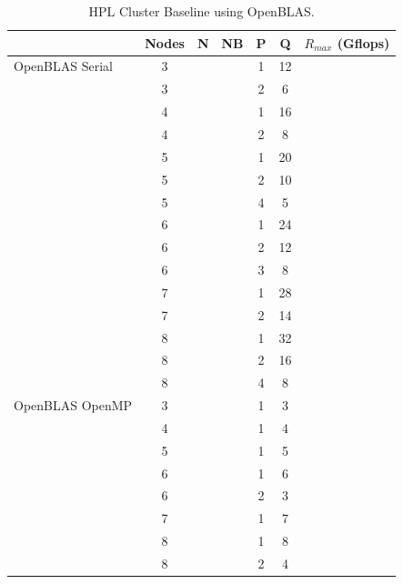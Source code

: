\documentclass{report}
\begin{document}
\begin{table}
\begin{center}
\begin{tabular}{ |l|c|c|c|c|c|c| } 
\hline
                & Nodes & N & NB & P & Q & $R_{max}$ (Gflops) \\ 
\hline
OpenBLAS Serial & 3 & & & 1 & 12 & \\ 
                & 3 & & & 2 &  6 & \\
                \cline{2-7} 
                & 4 & & & 1 & 16 & \\ 
                & 4 & & & 2 &  8 & \\ 
                \cline{2-7} 
                & 5 & & & 1 & 20 & \\ 
                & 5 & & & 2 & 10 & \\ 
                & 5 & & & 4 &  5 & \\ 
                \cline{2-7} 
                & 6 & & & 1 & 24 & \\ 
                & 6 & & & 2 & 12 & \\ 
                & 6 & & & 3 &  8 & \\ 
                \cline{2-7} 
                & 7 & & & 1 & 28 & \\ 
                & 7 & & & 2 & 14 & \\ 
                \cline{2-7} 
                & 8 & & & 1 & 32 & \\ 
                & 8 & & & 2 & 16 & \\ 
                & 8 & & & 4 &  8 & \\ 
\hline
OpenBLAS OpenMP & 3 & & & 1 & 3  & \\ 
                \cline{2-7} 
                & 4 & & & 1 & 4  & \\ 
                \cline{2-7} 
                & 5 & & & 1 & 5  & \\ 
                \cline{2-7} 
                & 6 & & & 1 & 6  & \\ 
                & 6 & & & 2 & 3  & \\ 
                \cline{2-7} 
                & 7 & & & 1 & 7  & \\ 
                \cline{2-7} 
                & 8 & & & 1 & 8  & \\ 
                & 8 & & & 2 & 4  & \\ 
\hline
\end{tabular}
\end{center}
\caption{\label{tab:table-name}HPL Cluster Baseline using OpenBLAS.}
\end{table}
\end{document}
